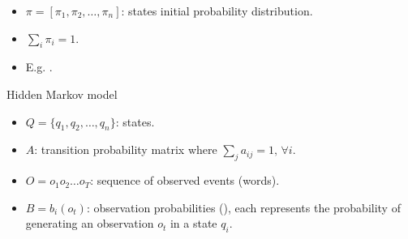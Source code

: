 \documentclass{KBook}
\begin{document}
	\begin{itemize}
		\item $\pi = [\pi_1, \pi_2, \ldots, \pi_n ]$: states initial probability distribution.
		\item $\sum_i \pi_i = 1$.
		\vspace{-6pt}\item E.g. .
	\end{itemize}
Hidden Markov model
	\begin{minipage}{.54\textwidth}
		\begin{itemize}
			\item $Q = \{q_1, q_2, \ldots, q_n\}$: states.
			\item $A$: transition probability matrix where $\sum_j a_{ij} = 1,\, \forall i$.
			\item $O = o_1 o_2 \ldots o_T$: sequence of observed events (words).
			\item $B = b_i(o_t)$: observation probabilities (), each represents the probability of generating an observation $o_t$ in a state $q_i$.
		\end{itemize}
	\end{minipage}
\end{document}
